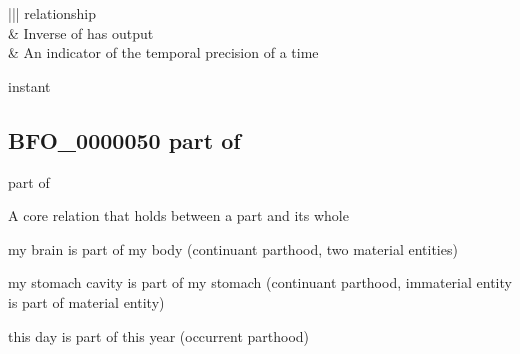 \documentclass[letterpaper,10pt,english]{sphinxmanual}
\begin{document}
\begin{savenotes}
\begin{longtable}[c]{|*{2}{|}}
\sphinxAtStartPar
relationship
\\
\hline
\sphinxAtStartPar
{\hyperref[\detokenize{doc-RO_0002353::doc}]{}}
&
\sphinxAtStartPar
Inverse of has output
\\
\hline
\sphinxAtStartPar
{\hyperref[\detokenize{doc-unitType::doc}]{}}
&
\sphinxAtStartPar
An indicator of the temporal precision of a time

\sphinxAtStartPar
instant
\\
\hline
\end{longtable}\sphinxatlongtableend\end{savenotes}
\begin{quote}

\ignorespaces \end{quote}


\subsection{BFO\_0000050 \sphinxhyphen{} part of}
\label{\detokenize{doc-BFO_0000050:bfo-0000050-part-of}}\label{\detokenize{doc-BFO_0000050:index-0}}\label{\detokenize{doc-BFO_0000050::doc}}
\begin{sphinxShadowBox}

\sphinxAtStartPar
part of
\end{sphinxShadowBox}

\begin{sphinxShadowBox}

\sphinxAtStartPar
A core relation that holds between a part and its whole
\end{sphinxShadowBox}

\begin{sphinxShadowBox}

\sphinxAtStartPar
my brain is part of my body (continuant parthood, two material entities)

\sphinxAtStartPar
my stomach cavity is part of my stomach (continuant parthood, immaterial entity is part of material entity)

\sphinxAtStartPar
this day is part of this year (occurrent parthood)
\end{sphinxShadowBox}
\end{document}

